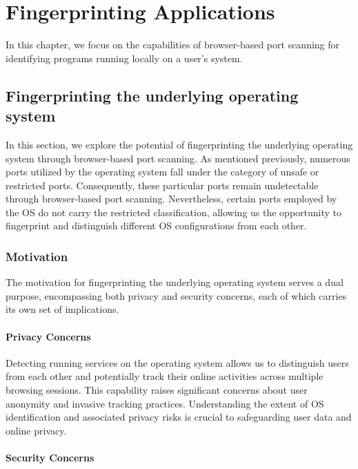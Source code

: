 \chapter{Fingerprinting Applications}

In this chapter, we focus on the capabilities of browser-based port scanning for identifying programs running locally on a user's system. 

\section{Fingerprinting the underlying operating system}

In this section, we explore the potential of fingerprinting the underlying operating system through browser-based port scanning. As mentioned previously, numerous ports utilized by the operating system fall under the category of unsafe or restricted ports. Consequently, these particular ports remain undetectable through browser-based port scanning.
Nevertheless, certain ports employed by the OS do not carry the restricted classification, allowing us the opportunity to fingerprint and distinguish different OS configurations from each other. 

\subsection{Motivation}

The motivation for fingerprinting the underlying operating system serves a dual purpose, encompassing both privacy and security concerns, each of which carries its own set of implications.

\subsubsection{Privacy Concerns}

Detecting running services on the operating system allows us to distinguish users from each other and potentially track their online activities across multiple browsing sessions. This capability raises significant concerns about user anonymity and invasive tracking practices. Understanding the extent of OS identification and associated privacy risks is crucial to safeguarding user data and online privacy.

\subsubsection{Security Concerns}

